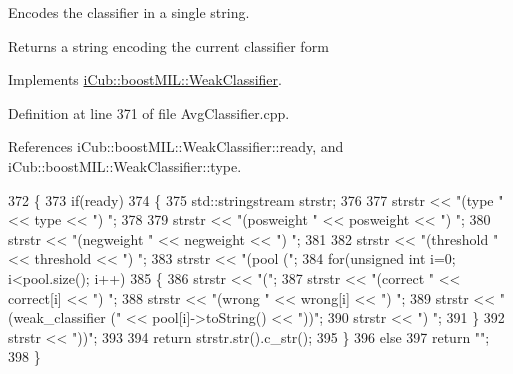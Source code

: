 Encodes the classifier in a single string. 

\begin{DoxyReturn}{Returns}
a string encoding the current classifier form 
\end{DoxyReturn}


Implements \hyperlink{classiCub_1_1boostMIL_1_1WeakClassifier_a980cd41ba074e3bdbfec697e7bee06f0}{i\+Cub\+::boost\+M\+I\+L\+::\+Weak\+Classifier}.



Definition at line 371 of file Avg\+Classifier.\+cpp.



References i\+Cub\+::boost\+M\+I\+L\+::\+Weak\+Classifier\+::ready, and i\+Cub\+::boost\+M\+I\+L\+::\+Weak\+Classifier\+::type.


\begin{DoxyCode}
372 \{
373     \textcolor{keywordflow}{if}(ready)
374     \{
375         std::stringstream strstr;
376 
377         strstr << \textcolor{stringliteral}{"(type "} << type << \textcolor{stringliteral}{") "};
378 
379         strstr << \textcolor{stringliteral}{"(posweight "} << posweight << \textcolor{stringliteral}{") "};
380         strstr << \textcolor{stringliteral}{"(negweight "} << negweight << \textcolor{stringliteral}{") "};
381 
382         strstr << \textcolor{stringliteral}{"(threshold "} << threshold << \textcolor{stringliteral}{") "};
383         strstr << \textcolor{stringliteral}{"(pool ("};
384         \textcolor{keywordflow}{for}(\textcolor{keywordtype}{unsigned} \textcolor{keywordtype}{int} i=0; i<pool.size(); i++)
385         \{
386             strstr << \textcolor{stringliteral}{"("};
387             strstr << \textcolor{stringliteral}{"(correct "} << correct[i] << \textcolor{stringliteral}{") "};
388             strstr << \textcolor{stringliteral}{"(wrong "} << wrong[i] << \textcolor{stringliteral}{") "};
389             strstr << \textcolor{stringliteral}{"(weak\_classifier ("} << pool[i]->toString() << \textcolor{stringliteral}{"))"};
390             strstr << \textcolor{stringliteral}{") "};
391         \}
392         strstr << \textcolor{stringliteral}{"))"};
393 
394         \textcolor{keywordflow}{return} strstr.str().c\_str();
395     \}
396     \textcolor{keywordflow}{else}
397         \textcolor{keywordflow}{return} \textcolor{stringliteral}{""};
398 \}
\end{DoxyCode}
